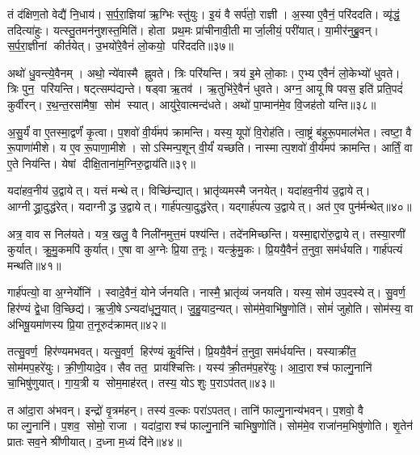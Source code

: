 तं द॑क्षिण॒तो वेद्यै॑ नि॒धाय॑।
स॒र्प॒रा॒ज्ञिया॑ ऋ॒ग्भिः स्तु॑युः।
इ॒यं वै सर्प॑तो॒ राज्ञी।
अ॒स्या ए॒वैनं॒ परि॑ददति।
व्यृ॑द्धं॒ तदित्या॑हुः।
यत्स्तु॒तमन॑नुशस्त॒मिति॑।
होता प्रथ॒मः प्रा॑चीनावी॒ती मार्जा॒लीयं॒ परी॑यात्।
या॒मीर॑नुब्रु॒वन्।
स॒र्प॒रा॒ज्ञीनां कीर्तयेत्।
उ॒भयो॑रे॒वैनं॑ लो॒कयो॒ परि॑ददति॥३७॥

अथो॑ धु॒वन्त्ये॒वैनम्।
अथो॒ न्ये॑वास्मै ह्नुवते।
त्रिः परि॑यन्ति।
त्रय॑ इ॒मे लो॒काः।
ए॒भ्य ए॒वैनं॑ लो॒केभ्यो॑ धुवते।
त्रिः पुन॒ परि॑यन्ति।
षट्त्सम्प॑द्यन्ते।
षड्वा ऋ॒तव॑।
ऋ॒तुभि॑रे॒वैनं॑ धुवते।
अग्न॒ आयूषि पवस॒ इति॑ प्रति॒पदं॑ कुर्वीरन्।
र॒थ॒न्त॒रसा॑मैषा॒ सोम॑ स्यात्।
आयु॑रे॒वात्मन्द॑धते।
अथो॑ पा॒प्मान॑मे॒व वि॒जह॑तो यन्ति॥३८॥\anuvakamend[अ॒भिजि॑त्यै पृथि॒व्याश्च॒ स्याद॑ध्व॒र्युर्ब्रू॑याल्लो॒कयो॒ परि॑ददति कुर्वीर॒स्त्रीणि॑ च]

अ॒सु॒र्यं॑ वा ए॒तस्मा॒द्वर्णं॑ कृ॒त्वा।
प॒शवो॑ वी॒र्य॑मप॑ क्रामन्ति।
यस्य॒ यूपो॑ वि॒रोह॑ति।
त्वा॒ष्ट्रं ब॑हुरू॒पमाल॑भेत।
त्वष्टा॒ वै रू॒पाणा॑मीशे।
य ए॒व रू॒पाणा॒मीशे।
सोऽस्मिन्प॒शून् वी॒र्यं॑ यच्छति।
नास्मात्प॒शवो॑ वी॒र्य॑मप॑ क्रामन्ति।
आर्तिं॒ वा ए॒ते निय॑न्ति।
येषां दीक्षि॒ताना॑म॒ग्निरु॒द्वाय॑ति॥३९॥

यदा॑हव॒नीय॑ उ॒द्वायेत्।
यत्तं मन्थेत्।
विच्छि॑न्द्यात्।
भ्रातृ॑व्यमस्मै जनयेत्।
यदा॑हव॒नीय॑ उ॒द्वायेत्।
आग्नीद्ध्रा॒दुद्ध॑\-रेत्।
यदाग्नीद्ध्र उ॒द्वायेत्।
गार्\mbox{}ह॑पत्या॒दुद्ध॑रेत्।
यद्गार्\mbox{}ह॑पत्य उ॒द्वायेत्।
अत॑ ए॒व पुन॑र्मन्थेत्॥४०॥

अत्र॒ वाव स निल॑यते।
यत्र॒ खलु॒ वै निली॑नमुत्त॒मं पश्य॑न्ति।
तदे॑नमिच्छन्ति।
यस्मा॒द्दारो॑रु॒द्वायेत्।
तस्या॒रणी॑ कुर्यात्।
क्रु॒मु॒कमपि॑ कुर्यात्।
ए॒षा वा अ॒ग्नेः प्रि॒या त॒नूः।
यत्क्रु॑मु॒कः।
प्रि॒ययै॒वैनं॑ त॒नुवा॒ सम॑र्धयति।
गार्\mbox{}ह॑पत्यं मन्थति॥४१॥

गार्\mbox{}ह॑पत्यो॒ वा अ॒ग्नेर्योनि॑।
स्वादे॒वैनं॒ योनेर्जनयति।
नास्मै॒ भ्रातृ॑व्यं जनयति।
यस्य॒ सोम॑ उप॒दस्येत्।
सु॒वर्ण॒ हिर॑ण्यं द्वे॒धा वि॒च्छिद्य॑।
ऋ॒जी॒षेऽन्यदा॑धूनु॒यात्।
जु॒हु॒याद॒न्यत्।
सोम॑मे॒वाभि॑षु॒णोति॑।
सोमं॑ जुहोति।
सोम॑स्य॒ वा अ॑भिषू॒यमा॑णस्य प्रि॒या त॒नूरुद॑क्रामत्॥४२॥

तत्सु॒वर्ण॒ हिर॑ण्यमभवत्।
यत्सु॒वर्ण॒ हिर॑ण्यं कु॒र्वन्ति॑।
प्रि॒ययै॒वैनं॑ त॒नुवा॒ सम॑र्धयन्ति।
यस्याक्री॑त॒ सोम॑मप॒हरे॑युः।
क्री॒णी॒यादे॒व।
सैव तत॒ प्राय॑श्चित्तिः।
यस्य॑ क्री॒तम॑प॒हरे॑युः।
आ॒दा॒राश्च॑ फाल्गु॒नानि॑ चा॒भिषु॑णुयात्।
गा॒य॒त्री य सोम॒माह॑रत्।
तस्य॒ योऽशुः प॒राऽप॑तत्॥४३॥

त आ॑दा॒रा अ॑भवन्।
इन्द्रो॑ वृ॒त्रम॑हन्।
तस्य॑ व॒ल्कः परा॑ऽपतत्।
तानि॑ फाल्गु॒नान्य॑भवन्।
प॒शवो॒ वै फाल्गु॒नानि॑।
प॒शव॒ सोमो॒ राजा।
यदा॑दा॒राश्च॑ फाल्गु॒नानि॑ चाभिषु॒णोति॑।
सोम॑मे॒व राजा॑नम॒भिषु॑णोति।
शृ॒तेन॑ प्रातः सव॒ने श्री॑णीयात्।
द॒ध्ना म॒ध्यं दि॑ने॥४४॥

